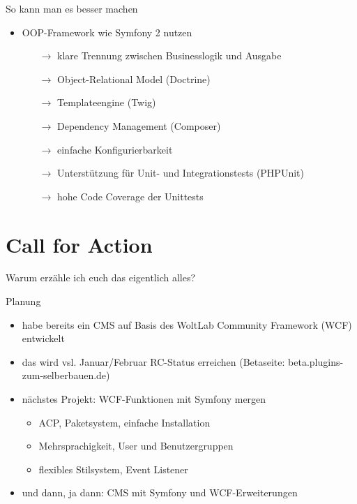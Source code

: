 \documentclass{beamer}
\begin{document}
\begin{frame}{So kann man es besser machen}
	\begin{itemize}
		\item	OOP-Framework wie Symfony 2 nutzen
		\begin{itemize}
			\item[$\rightarrow$] klare Trennung zwischen Businesslogik und Ausgabe
			\item[$\rightarrow$] Object-Relational Model (Doctrine)
			\item[$\rightarrow$] Templateengine (Twig)	
			\item[$\rightarrow$] Dependency Management (Composer)
			\item[$\rightarrow$] einfache Konfigurierbarkeit
			\item[$\rightarrow$] Unterstützung für Unit- und Integrationstests (PHPUnit)
			\item[$\rightarrow$] hohe Code Coverage der Unittests
		\end{itemize}
	\end{itemize}
\end{frame}

\section{Call for Action}
\begin{frame}
	\centering
	Warum erzähle ich euch das eigentlich alles?
\end{frame}

\begin{frame}{Planung}
	\begin{itemize}
		\item	habe bereits ein CMS auf Basis des WoltLab Community Framework (WCF) entwickelt
		\item	das wird vsl. Januar/Februar RC-Status erreichen (Betaseite: beta.plugins-zum-selberbauen.de)
		\item	nächstes Projekt: WCF-Funktionen mit Symfony mergen
		\begin{itemize}
			\item	ACP, Paketsystem, einfache Installation
			\item	Mehrsprachigkeit, User und Benutzergruppen
			\item	flexibles Stilsystem, Event Listener
		\end{itemize}
		\item	und dann, ja dann: CMS mit Symfony und WCF-Erweiterungen
	\end{itemize}
\end{frame}
\end{document}
